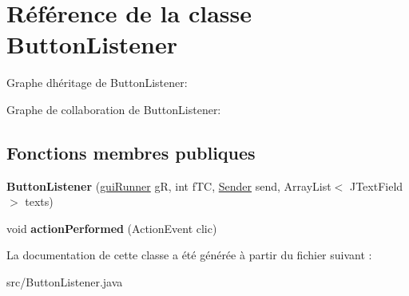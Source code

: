 \hypertarget{classButtonListener}{}\section{Référence de la classe Button\+Listener}
\label{classButtonListener}


Graphe d\textquotesingle{}héritage de Button\+Listener\+:


Graphe de collaboration de Button\+Listener\+:
\subsection*{Fonctions membres publiques}
\begin{DoxyCompactItemize}
\item 
\mbox{\label{classButtonListener_a0a2a43d46947f5c8a3915af133b716c9}} 
{\bfseries Button\+Listener} (\hyperlink{classguiRunner}{gui\+Runner} gR, int f\+TC, \hyperlink{interfaceSender}{Sender} send, Array\+List$<$ J\+Text\+Field $>$ texts)
\item 
\mbox{\label{classButtonListener_acf7cb9b34d31cae051227ae5dbcd59a5}} 
void {\bfseries action\+Performed} (Action\+Event clic)
\end{DoxyCompactItemize}


La documentation de cette classe a été générée à partir du fichier suivant \+:\begin{DoxyCompactItemize}
\item 
src/Button\+Listener.\+java\end{DoxyCompactItemize}
